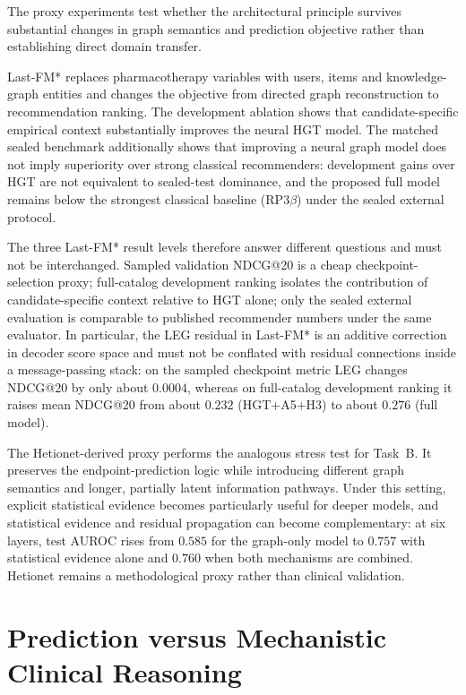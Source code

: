 The proxy experiments test whether the architectural principle survives substantial
changes in graph semantics and prediction objective rather than establishing direct domain
transfer.

Last-FM* replaces pharmacotherapy variables with users, items and knowledge-graph
entities and changes the objective from directed graph reconstruction to recommendation
ranking. The development ablation shows that candidate-specific empirical context
substantially improves the neural HGT model.
The matched sealed benchmark additionally
shows that improving a neural graph model does not imply superiority over strong
classical recommenders:
development gains over HGT are not equivalent to sealed-test dominance, and the proposed
full model remains below the strongest classical baseline (RP$3\beta$) under the sealed
external protocol.

The three Last-FM* result levels therefore answer different questions and must not be
interchanged.
Sampled validation NDCG@20 is a cheap checkpoint-selection proxy;
full-catalog development ranking isolates the contribution of candidate-specific context
relative to HGT alone;
only the sealed external evaluation is comparable to published recommender numbers under
the same evaluator.
In particular, the LEG residual in Last-FM* is an additive correction in decoder score space
and must not be conflated with residual connections inside a message-passing stack:
on the sampled checkpoint metric LEG changes NDCG@20 by only about $0.0004$, whereas on
full-catalog development ranking it raises mean NDCG@20 from about $0.232$ (HGT+A5+H3)
to about $0.276$ (full model).

The Hetionet-derived proxy performs the analogous stress test for Task~B. It preserves the
endpoint-prediction logic while introducing different graph semantics and longer,
partially latent information pathways. Under this setting, explicit statistical evidence
becomes particularly useful for deeper models, and statistical evidence and residual
propagation can become complementary:
at six layers, test AUROC rises from $0.585$ for the graph-only model to $0.757$ with
statistical evidence alone and $0.760$ when both mechanisms are combined.
Hetionet remains a methodological proxy rather than clinical validation.

\section{Prediction versus Mechanistic Clinical Reasoning}
\label{sec:joint-mechanistic-reasoning}

